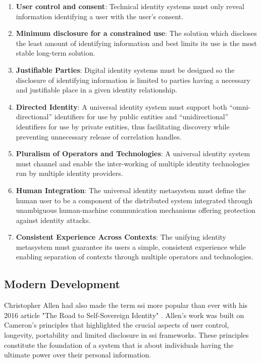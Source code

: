 \begin{enumerate}
  \item \textbf{User control and consent}: Technical identity systems must only reveal information identifying a user with the user’s consent.
  \item \textbf{Minimum disclosure for a constrained use}: The solution which discloses the least amount of identifying information and best limits its use is the most 
  stable long-term solution.
  \item \textbf{Justifiable Parties}: Digital identity systems must be designed so the disclosure of identifying information is limited to parties having a necessary and 
  justifiable place in a given identity relationship.
  \item \textbf{Directed Identity}: A universal identity system must support both “omni-directional” identifiers for use by public entities and “unidirectional” identifiers 
  for use by private entities, thus facilitating discovery while preventing unnecessary release of correlation handles.
  \item \textbf{Pluralism of Operators and Technologies}: A universal identity system must channel and enable the inter-working of multiple identity technologies run by 
  multiple identity providers.
  \item \textbf{Human Integration}: The universal identity metasystem must define the human user to be a component of the distributed system integrated through unambiguous 
  human-machine communication mechanisms offering protection against identity attacks.
  \item \textbf{Consistent Experience Across Contexts}: The unifying identity metasystem must guarantee its users a simple, consistent experience while enabling separation 
  of contexts through multiple operators and technologies.
\end{enumerate}

\subsection{Modern Development}

Christopher Allen had also made the term \gls{ssi} more popular than ever with his 2016 article "The Road to Self-Sovereign Identity" \cite{businessreporter}. Allen’s work 
was built on Cameron’s principles that highlighted the crucial aspects of user control, longevity, portability and limited disclosure in \gls{ssi} frameworks. These principles 
constitute the foundation of a system that is about individuals having the ultimate power over their personal information.

